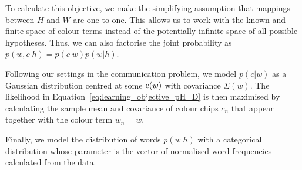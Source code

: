\documentclass[11pt]{article}
\begin{document}
To calculate this objective, we make the simplifying assumption that mappings between $H$ and $W$ are one-to-one. 
This allows us to work with the known and finite space of colour terms instead of the potentially infinite space of all possible hypotheses.
Thus, we can also factorise the joint probability as $p(w,c|h) = p(c|w)p(w|h)$.

Following our settings in the communication problem, we model $p(c|w)$ as a Gaussian distribution centred at some ${\textnormal{c}}(w)$ with covariance $\Sigma(w)$. 
The likelihood in Equation~\ref{eq:learning_objective_pH_D} is then maximised by calculating the sample mean and covariance of colour chips $c_n$ that appear together with the colour term $w_n=w$.

Finally, we model the distribution of words $p(w|h)$ with a categorical distribution whose parameter is the vector of normalised word frequencies calculated from the data.
 
\end{document}
